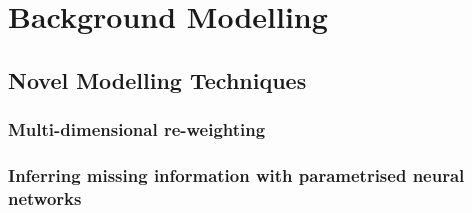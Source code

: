 \chapter{Background Modelling}%
\label{sec:modelling}
\section{Novel Modelling Techniques}%
\label{sec:novel-modelling}
\subsection{Multi-dimensional re-weighting}%
\label{sec:bdtr}
\subsection{Inferring missing information with parametrised neural networks}%
\label{sec:param-net}
